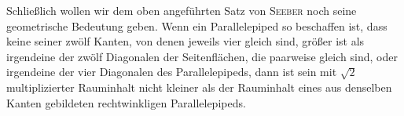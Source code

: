 Schließlich wollen wir dem oben angeführten Satz von \textsc{Seeber} noch seine geometrische Bedeutung geben. Wenn ein Parallelepiped so beschaffen ist, dass keine seiner zwölf Kanten, von denen jeweils vier gleich sind, größer ist als irgendeine der zwölf Diagonalen der Seitenflächen, die paarweise gleich sind, oder irgendeine der vier Diagonalen des Parallelepipeds, dann ist sein mit $\surd2$ multiplizierter Rauminhalt nicht kleiner als der Rauminhalt eines aus denselben Kanten gebildeten rechtwinkligen Parallelepipeds.
